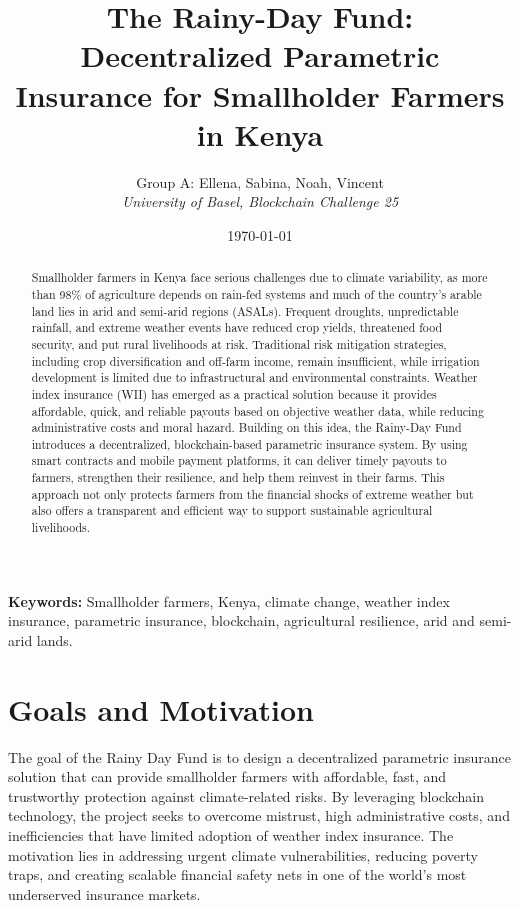 \documentclass[11pt,a4paper]{article}
\title{\textbf{The Rainy-Day Fund: Decentralized Parametric Insurance for Smallholder Farmers in Kenya}}
\author{
	Group A: Ellena, Sabina, Noah, Vincent\\[0.5em]
	\textit{University of Basel, Blockchain Challenge 25}
	}
\date{\today}
\begin{document}
	\maketitle

	\begin{abstract}
    Smallholder farmers in Kenya face serious challenges due to climate variability, as more than 98\% of agriculture depends on rain-fed systems and much of the country's arable land lies in arid and semi-arid regions (ASALs).
    Frequent droughts, unpredictable rainfall, and extreme weather events have reduced crop yields, threatened food security, and put rural livelihoods at risk.
    Traditional risk mitigation strategies, including crop diversification and off-farm income, remain insufficient, while irrigation development is limited due to infrastructural and environmental constraints.
    Weather index insurance (WII) has emerged as a practical solution because it provides affordable, quick, and reliable payouts based on objective weather data, while reducing administrative costs and moral hazard.
    Building on this idea, the Rainy-Day Fund introduces a decentralized, blockchain-based parametric insurance system.
    By using smart contracts and mobile payment platforms, it can deliver timely payouts to farmers, strengthen their resilience, and help them reinvest in their farms.
    This approach not only protects farmers from the financial shocks of extreme weather but also offers a transparent and efficient way to support sustainable agricultural livelihoods.
    \end{abstract}

    \textbf{Keywords:} Smallholder farmers, Kenya, climate change, weather index insurance, parametric insurance, blockchain, agricultural resilience, arid and semi-arid lands.

    \tableofcontents
    \bigskip

    \section{Goals and Motivation}\label{sec:goals}
    The goal of the Rainy Day Fund is to design a decentralized parametric insurance solution that can provide smallholder farmers with affordable, fast, and trustworthy protection against climate-related risks.
    By leveraging blockchain technology, the project seeks to overcome mistrust, high administrative costs, and inefficiencies that have limited adoption of weather index insurance.
    The motivation lies in addressing urgent climate vulnerabilities, reducing poverty traps, and creating scalable financial safety nets in one of the world's most underserved insurance markets.
\end{document}
